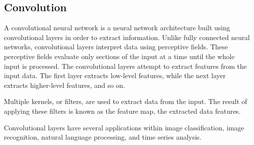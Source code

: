 \subsection{Convolution}
A convolutional neural network is a neural network architecture built using convolutional layers in order to extract information.
Unlike fully connected neural networks, convolutional layers interpret data using perceptive fields.
These perceptive fields evaluate only sections of the input at a time until the whole input is processed.
The convolutional layers attempt to extract features from the input data.
The first layer extracts low-level features, while the next layer extracts higher-level features, and so on.

\cite[p.~443-446]{Geron2017}


Multiple kernels, or filters, are used to extract data from the input.
The result of applying these filters is known as the feature map, the extracted data features.

Convolutional layers have several applications within image classification,
image recognition, natural language processing, and time series analysis.


